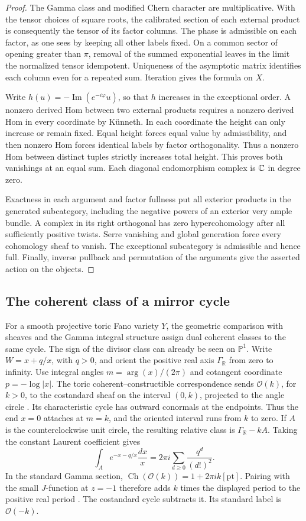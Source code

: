 \begin{proof}
The Gamma class and modified Chern character are multiplicative. With the tensor choices of square roots, the calibrated section of each external product is consequently the tensor of its factor columns. The phase is admissible on each factor, as one sees by keeping all other labels fixed. On a common sector of opening greater than $\pi$, removal of the summed exponential leaves in the limit the normalized tensor idempotent. Uniqueness of the asymptotic matrix identifies each column even for a repeated sum. Iteration gives the formula on $X$.

Write $h(u)=-\operatorname{Im}(e^{-i\varphi}u)$, so that $h$ increases in the exceptional order. A nonzero derived Hom between two external products requires a nonzero derived Hom in every coordinate by K\"unneth. In each coordinate the height can only increase or remain fixed. Equal height forces equal value by admissibility, and then nonzero Hom forces identical labels by factor orthogonality. Thus a nonzero Hom between distinct tuples strictly increases total height. This proves both vanishings at an equal sum. Each diagonal endomorphism complex is $\mathbb C$ in degree zero.

Exactness in each argument and factor fullness put all exterior products in the generated subcategory, including the negative powers of an exterior very ample bundle. A complex in its right orthogonal has zero hypercohomology after all sufficiently positive twists. Serre vanishing and global generation force every cohomology sheaf to vanish. The exceptional subcategory is admissible and hence full. Finally, inverse pullback and permutation of the arguments give the asserted action on the objects.
\end{proof}

\subsection{The coherent class of a mirror cycle}

For a smooth projective toric Fano variety $Y$, the geometric comparison with sheaves and the Gamma integral structure assign dual coherent classes to the same cycle. The sign of the divisor class can already be seen on $\mathbb P^1$. Write $W=x+q/x$, with $q>0$, and orient the positive real axis $\Gamma_{\mathbb R}$ from zero to infinity. Use integral angles $m=\arg(x)/(2\pi)$ and cotangent coordinate $p=-\log|x|$. The toric coherent--constructible correspondence sends $\mathcal O(k)$, for $k>0$, to the costandard sheaf on the interval $(0,k)$, projected to the angle circle \cite[\S3.1]{Fang}. Its characteristic cycle has outward conormals at the endpoints. Thus the end $x=0$ attaches at $m=k$, and the oriented interval runs from $k$ to zero. If $A$ is the counterclockwise unit circle, the resulting relative class is $\Gamma_{\mathbb R}-kA$. Taking the constant Laurent coefficient gives
\[
 \int_A e^{-x-q/x}\frac{dx}{x}
      =2\pi i\sum_{d\ge0}\frac{q^d}{(d!)^2}.
\]
In the standard Gamma section, $\operatorname{Ch}(\mathcal O(k))=1+2\pi i k[\mathrm{pt}]$. Pairing with the small $J$-function at $z=-1$ therefore adds $k$ times the displayed period to the positive real period \cite[\S5]{GGI}. The costandard cycle subtracts it. Its standard label is $\mathcal O(-k)$.

